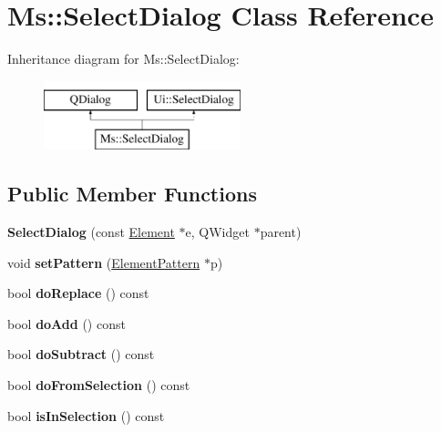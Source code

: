 \hypertarget{class_ms_1_1_select_dialog}{}\section{Ms\+:\+:Select\+Dialog Class Reference}
\label{class_ms_1_1_select_dialog}
Inheritance diagram for Ms\+:\+:Select\+Dialog\+:\begin{figure}[H]
\begin{center}
\leavevmode
\includegraphics[height=2.000000cm]{class_ms_1_1_select_dialog}
\end{center}
\end{figure}
\subsection*{Public Member Functions}
\begin{DoxyCompactItemize}
\item 
\mbox{\label{class_ms_1_1_select_dialog_a27c2925138de88ca9208f83d2753e194}} 
{\bfseries Select\+Dialog} (const \hyperlink{class_ms_1_1_element}{Element} $\ast$e, Q\+Widget $\ast$parent)
\item 
\mbox{\label{class_ms_1_1_select_dialog_a6bfeccc16e33709561393be82e9ade47}} 
void {\bfseries set\+Pattern} (\hyperlink{struct_ms_1_1_element_pattern}{Element\+Pattern} $\ast$p)
\item 
\mbox{\label{class_ms_1_1_select_dialog_a342aadaff57f6fffa37042423f05f042}} 
bool {\bfseries do\+Replace} () const
\item 
\mbox{\label{class_ms_1_1_select_dialog_ad79b4ac73b12df5e1fc1b14f5caec1bd}} 
bool {\bfseries do\+Add} () const
\item 
\mbox{\label{class_ms_1_1_select_dialog_ad688319475ec721b847597ad7b1fe6b8}} 
bool {\bfseries do\+Subtract} () const
\item 
\mbox{\label{class_ms_1_1_select_dialog_adf4097151d7ed639378a82af67631d44}} 
bool {\bfseries do\+From\+Selection} () const
\item 
\mbox{\label{class_ms_1_1_select_dialog_af74a09a2e8fe8f5c6a5cb0fbaa41b00d}} 
bool {\bfseries is\+In\+Selection} () const
\end{DoxyCompactItemize}


